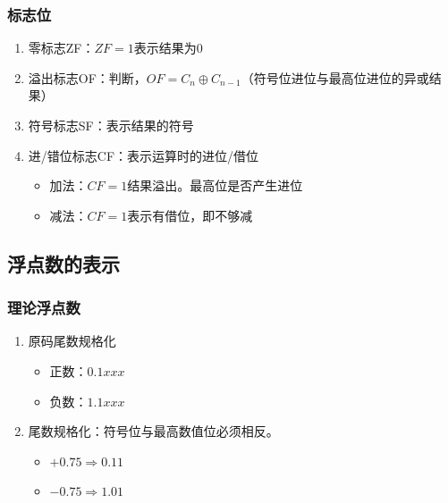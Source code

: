 \documentclass[a4paper,12pt]{article}
\begin{document}
    \subsubsection{标志位}

    \begin{enumerate}
        \item 零标志ZF：$ZF = 1$表示结果为0
        \item 溢出标志OF：判断{\color{blue}{有符号数}}，$OF = C_n\oplus C_{n-1}$（符号位进位与最高位进位的异或结果）
        \item 符号标志SF：表示结果的符号
        \item 进/错位标志CF：表示{\color{blue}{无符号数}}运算时的进位/借位
        \begin{itemize}
            \item 加法：$CF = 1$结果溢出。最高位是否产生进位
            \item 减法：$CF = 1$表示有借位，即不够减
        \end{itemize}
    \end{enumerate}

    \subsection{浮点数的表示}

    \subsubsection{理论浮点数}

    \begin{enumerate}
        \item 原码尾数规格化
        \begin{itemize}
            \item 正数：$0.1xxx$
            \item 负数：$1.1xxx$
        \end{itemize}
        \item {\color{red}{补码}}尾数规格化：符号位与最高数值位必须相反。
        \begin{itemize}
            \item $+0.75 \Rightarrow 0.11$
            \item $-0.75 \Rightarrow 1.01$
        \end{itemize}
    \end{enumerate}
\end{document}
